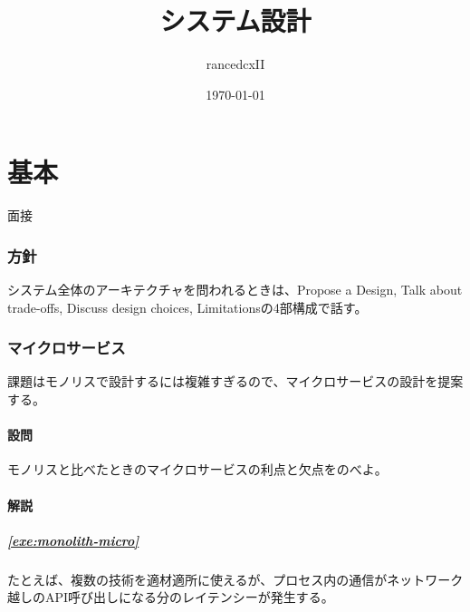 \documentclass[book]{jlreq}
\begin{document}
\title{システム設計}
\author{rancedcxII}
\date{\today}
\maketitle
\tableofcontents
\part{基本}
\begin{chapter-bib}{面接}
  \section{方針}
  システム全体のアーキテクチャを問われるときは、Propose a Design, Talk about trade-offs, Discuss design choices, Limitationsの4部構成で話す\cite{lc-high}。
  \section{マイクロサービス}
  課題はモノリスで設計するには複雑すぎるので、マイクロサービスの設計を提案する\cite{lc-aa}。
  \subsection{設問}
  \begin{exercise}
  \item モノリスと比べたときのマイクロサービスの利点と欠点をのべよ。\label{exe:monolith-micro}  
  \end{exercise}
  \subsection{解説}
  \subsubsection{\ref{exe:monolith-micro}}
  たとえば、複数の技術を適材適所に使えるが、プロセス内の通信がネットワーク越しのAPI呼び出しになる分のレイテンシーが発生する\cite{lc-aa}。
\end{chapter-bib}
 
\end{document}
